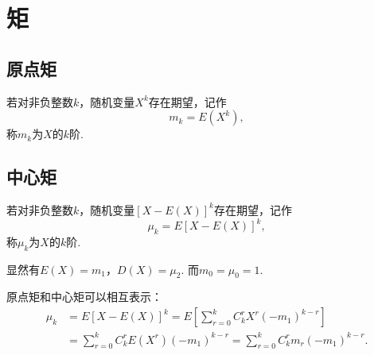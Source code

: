 \section{矩}
\subsection{原点矩}
\begin{definition}
若对非负整数\(k\)，随机变量\(X^k\)存在期望，记作\begin{equation*}
m_k = E(X^k),
\end{equation*}称\(m_k\)为\(X\)的\(k\)阶.
\end{definition}

\subsection{中心矩}
\begin{definition}
若对非负整数\(k\)，随机变量\([X-E(X)]^k\)存在期望，记作\begin{equation*}
\mu_k = E[X-E(X)]^k,
\end{equation*}称\(\mu_k\)为\(X\)的\(k\)阶.
\end{definition}

显然有\(E(X) = m_1\)，\(D(X) = \mu_2\).
而\(m_0 = \mu_0 = 1\).

原点矩和中心矩可以相互表示：
\begin{align*}
	\mu_k &= E[X-E(X)]^k
	= E\left[ \sum_{r=0}^k{C_k^r X^r (-m_1)^{k-r}} \right] \\
	&= \sum_{r=0}^k{C_k^r E(X^r) (-m_1)^{k-r}}
	= \sum_{r=0}^k{C_k^r m_r (-m_1)^{k-r}}.
\end{align*}
